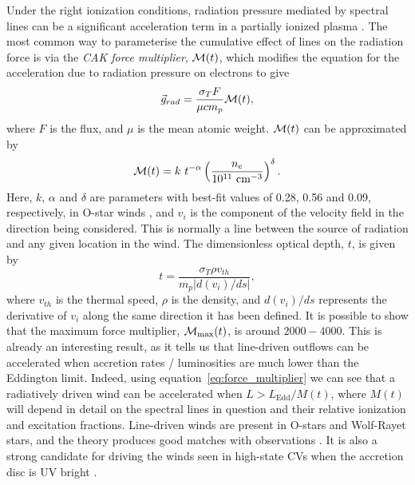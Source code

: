 \label{sec:line_driving}
Under the right ionization conditions, radiation pressure mediated by spectral lines
can be a significant  acceleration term in 
a partially ionized plasma \citep[][hereafter CAK]{CAK75}. 
The most common way to parameterise the cumulative
effect of lines on the radiation force is via the 
{\em CAK force multiplier}, ${\cal M}(t)$,
which modifies the equation for the acceleration due to radiation pressure on electrons
to give \citep[][CAK]{castor1974}
\begin{equation}
\label{eq:force_multiplier}
\vec{g}_{rad} = \frac{\sigma_T F}{\mu c m_p} {\cal M}(t),
\end{equation}
where $F$ is the flux, and $\mu$ is the mean atomic weight.
${\cal M}(t)$ can be approximated by \citep{abbott1982}
\begin{equation}
\label{eq:force_multiplier2}
{\cal M}(t) = k~t^{-\alpha} 
\left( \frac{n_e}{10^{11}~{\rm cm}^{-3}}\right)^\delta.
\end{equation}
Here, $k$, $\alpha$ and $\delta$ are parameters
with best-fit values of 0.28, 0.56 and 0.09, respectively, in O-star winds \citep{abbott1982},
and $v_i$ is the component of the velocity field in the direction
being considered. This is normally a line between the source of radiation and any
given location in the wind.
The dimensionless optical depth, $t$, is given by
\begin{equation}
t = \frac{\sigma_T \rho v_{th}}{m_p | d(v_i) / ds |},
\end{equation}
where $v_{th}$ is the thermal speed, $\rho$ is the density, and $d(v_i) / ds$ represents
the derivative of $v_i$ along the same direction it has been defined.
It is possible to show \citep[CAK, ][]{owocki1988} that the maximum force multiplier,
${\cal M}_{\mathrm{max}}(t)$,
is around $2000-4000$. This is already an interesting result, as it tells us
that line-driven outflows can be accelerated when accretion rates / luminosities
are much lower than the Eddington limit. Indeed, using 
equation~\ref{eq:force_multiplier} we can see that a radiatively driven wind 
can be accelerated when $L > L_{\mathrm{Edd}} / M(t)$, where $M(t)$ will depend in detail on
the spectral lines in question and their relative ionization and excitation fractions.
Line-driven winds are present in O-stars and Wolf-Rayet stars, and the theory
produces good matches with observations 
\citep[e.g.][]{friend1986,pauldrach1986,pauldrach1994,hamann2008}. 
It is also a strong candidate for driving
the winds seen in high-state CVs when the accretion disc is UV bright 
\citep[][see also section~\ref{sec:proga}]{pereyra1997,proga1998,proga2005}.

